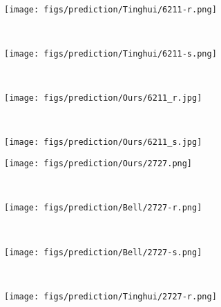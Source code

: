 \documentclass[10pt,twocolumn,letterpaper]{article}
\begin{document}
\begin{figure*}[ptb]
\begin{subfigure}[b]{0.135\textwidth}
    \end{subfigure} \hspace*{-0.8em}
    ~
    \begin{subfigure}[b]{0.135\textwidth}
        \texttt{[image: figs/prediction/Tinghui/6211-r.png]}
    \end{subfigure} \hspace*{-0.8em}
    ~    
    \begin{subfigure}[b]{0.135\textwidth}
        \texttt{[image: figs/prediction/Tinghui/6211-s.png]}
    \end{subfigure}   \hspace*{-0.8em}
    ~
    \begin{subfigure}[b]{0.135\textwidth}
        \texttt{[image: figs/prediction/Ours/6211\_r.jpg]}
    \end{subfigure}   \hspace*{-0.8em}
    ~    
    \begin{subfigure}[b]{0.135\textwidth}
        \texttt{[image: figs/prediction/Ours/6211\_s.jpg]}
    \end{subfigure} 
	 \begin{subfigure}[b]{0.135\textwidth}
        \texttt{[image: figs/prediction/Ours/2727.png]}
    \end{subfigure} \hspace*{-0.8em}
    ~
    \begin{subfigure}[b]{0.135\textwidth}
        \texttt{[image: figs/prediction/Bell/2727-r.png]}
    \end{subfigure} \hspace*{-0.8em}
    ~
    \begin{subfigure}[b]{0.135\textwidth}
        \texttt{[image: figs/prediction/Bell/2727-s.png]}
    \end{subfigure} \hspace*{-0.8em}
    ~
    \begin{subfigure}[b]{0.135\textwidth}
        \texttt{[image: figs/prediction/Tinghui/2727-r.png]}

\end{subfigure}
\end{figure*}
\end{document}
